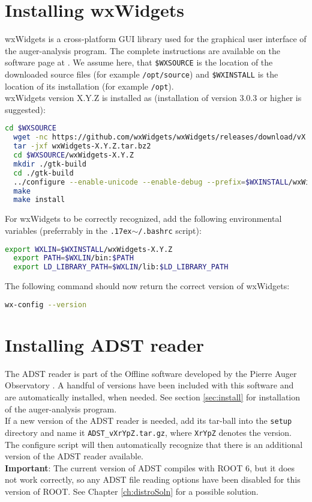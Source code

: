 \documentclass[12pt,a4paper]{report}
\newcommand{\mytilde}{\raise.17ex\hbox{$\scriptstyle\mathtt{\sim}$}}		%
\begin{document}
\section{Installing wxWidgets}
wxWidgets is a cross-platform GUI library used for the graphical user interface of the auger-analysis program. The complete instructions are available on the software page at \cite{wxWidgets}. We assume here, that \texttt{\$WXSOURCE} is the location of the downloaded source files (for example \texttt{/opt/source}) and \texttt{\$WXINSTALL} is the location of its installation (for example \texttt{/opt}).\\
wxWidgets version X.Y.Z is installed as (installation of version 3.0.3 or higher is suggested):
\begin{lstlisting}[language=bash]
  cd $WXSOURCE
  wget -nc https://github.com/wxWidgets/wxWidgets/releases/download/vX.Y.Z/wxWidgets-X.Y.Z.tar.bz2
  tar -jxf wxWidgets-X.Y.Z.tar.bz2
  cd $WXSOURCE/wxWidgets-X.Y.Z
  mkdir ./gtk-build
  cd ./gtk-build
  ../configure --enable-unicode --enable-debug --prefix=$WXINSTALL/wxWidgets-X.Y.Z
  make
  make install
\end{lstlisting}
For wxWidgets to be correctly recognized, add the following environmental variables (preferrably in the \texttt{\mytilde/.bashrc} script):
\begin{lstlisting}[language=bash]
  export WXLIN=$WXINSTALL/wxWidgets-X.Y.Z
  export PATH=$WXLIN/bin:$PATH
  export LD_LIBRARY_PATH=$WXLIN/lib:$LD_LIBRARY_PATH
\end{lstlisting}
The following command should now return the correct version of wxWidgets:
\begin{lstlisting}[language=bash]
  wx-config --version
\end{lstlisting}

\section{Installing ADST reader}
The ADST reader is part of the Offline software developed by the Pierre Auger Observatory \cite{offline}. A handful of versions have been included with this software and are automatically installed, when needed. See section \ref{sec:install} for installation of the auger-analysis program.\\
If a new version of the ADST reader is needed, add its tar-ball into the \texttt{setup} directory and name it \texttt{ADST\_vXrYpZ.tar.gz}, where \texttt{XrYpZ} denotes the version. The configure script will then automatically recognize that there is an additional version of the ADST reader available.\\
\textbf{Important}: The current version of ADST compiles with ROOT 6, but it does not work correctly, so any ADST file reading options have been disabled for this version of ROOT. See Chapter \ref{ch:distroSoln} for a possible solution.
\end{document}
